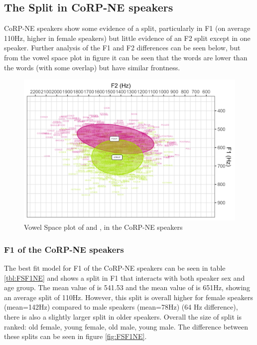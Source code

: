 \documentclass[../../../00.FullDoc/tex/ThesisSkeleton-draft2]{subfiles}
\begin{document}
\subsection{The  Split in CoRP-NE speakers} \label{subsec:FSNE}
CoRP-NE speakers show some evidence of a \FS{} split, particularly in F1 (on average 110Hz, higher in female speakers) but little evidence of an F2 split except in one speaker. Further analysis of the F1 and F2 differences can be seen below, but from the vowel space plot in figure it can be seen that the \strutt{} words are lower than the \foot{} words (with some overlap) but have similar frontness.

\begin{figure}[h]
	\includegraphics[width=\textwidth]{../figures/FS-NE-vplot.png}
	\caption{Vowel Space plot of \foot{} and \strutt{}, in the CoRP-NE speakers} \label{fig:FSvplotNE}
\end{figure}


\subsubsection{F1 of the CoRP-NE speakers} \label{subsubsec:NEF1}

The best fit model for F1 of the CoRP-NE speakers can be seen in table \ref{tbl:FSF1NE} and shows a \FS{} split in F1 that interacts with both speaker sex and age group. The mean value of \foot{} is 541.53 and the mean value of \strutt{} is 651Hz, showing an average split of 110Hz. However, this split is overall higher for female speakers (mean=142Hz) compared to male speakers (mean=78Hz) (64 Hz difference), there is also a slightly larger split in older speakers. Overall the size of split is ranked: old female, young female, old male, young male. The difference between these splits can be seen in figure \ref{fig:FSF1NE}.
\end{document}
